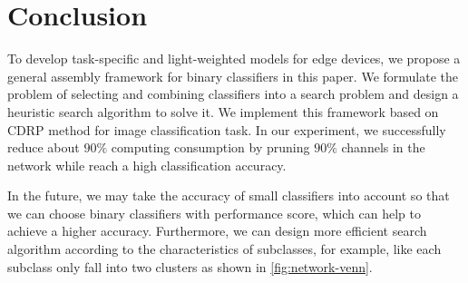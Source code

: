 \documentclass[sigplan,10pt,review]{acmart}\settopmatter{printfolios=true,printccs=false,printacmref=false}
\begin{document}
\section{Conclusion}
To develop task-specific and light-weighted models for edge devices, we propose a general assembly framework for binary classifiers in this paper.
We formulate the problem of selecting and combining classifiers into a search problem and design a heuristic search algorithm to solve it.
We implement this framework based on CDRP method for image classification task. 
In our experiment, we successfully reduce about $90\%$ computing consumption by pruning $90\%$ channels in the network while reach a high classification accuracy.

In the future, we may take the accuracy of small classifiers into account so that we can choose binary classifiers with performance score, which can help to achieve a higher accuracy. 
Furthermore, we can design more efficient search algorithm according to the characteristics of subclasses, for example, like each subclass only fall into two clusters as shown in  \cref{fig:network-venn}.



% 
% 




\end{document}
